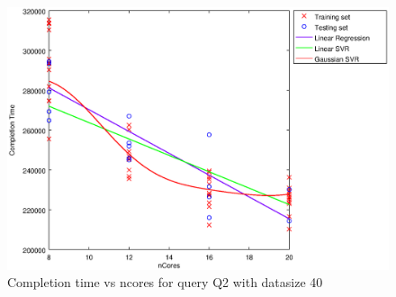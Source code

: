 
\begin {figure}[hbtp]
\centering
\includegraphics[width=\textwidth]{output/Q2_40_ONLY_NCORES/plot_Q2_40_bestmodels.eps}
\caption{Completion time vs ncores for query Q2 with datasize 40}
\label{fig:all_linear_Q2_40}
\end {figure}
